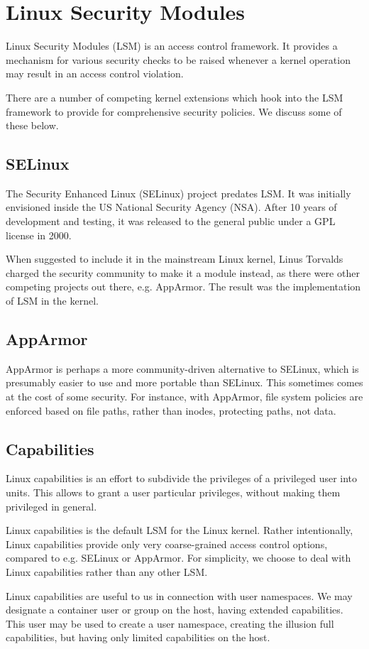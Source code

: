 
\section{Linux Security Modules}

Linux Security Modules (LSM) is an access control framework. It provides a
mechanism for various security checks to be raised whenever a kernel operation
may result in an access control violation\cite{wright-et-al-2002,lsm.txt}.

There are a number of competing kernel extensions which hook into the LSM
framework to provide for comprehensive security policies. We discuss some of
these below.

\subsection{SELinux}

The Security Enhanced Linux\textsuperscript{\textregistered} (SELinux) project
predates LSM. It was initially envisioned inside the US National Security
Agency (NSA). After 10 years of development and testing, it was released to the
general public under a GPL license in 2000\cite{ivashko-2012}.

When suggested to include it in the mainstream Linux kernel, Linus Torvalds
charged the security community to make it a module instead, as there were other
competing projects out there, e.g. AppArmor. The result was the implementation
of LSM in the kernel\cite{wright-et-al-2002}.

\subsection{AppArmor}

AppArmor is perhaps a more community-driven alternative to SELinux, which is
presumably easier to use and more portable than SELinux\cite{spenneberg-2006}.
This sometimes comes at the cost of some security. For instance, with AppArmor,
file system policies are enforced based on file paths, rather than inodes,
protecting paths, not data.

\subsection{Capabilities}

Linux capabilities is an effort to subdivide the privileges of a privileged
user into units. This allows to grant a user particular privileges, without
making them privileged in general.

Linux capabilities is the default LSM for the Linux kernel\cite{lsm.txt}.
Rather intentionally, Linux capabilities provide only very coarse-grained
access control options, compared to e.g. SELinux or AppArmor. For simplicity,
we choose to deal with Linux capabilities rather than any other LSM.

Linux capabilities are useful to us in connection with user namespaces. We may
designate a container user or group on the host, having extended capabilities.
This user may be used to create a user namespace, creating the illusion full
capabilities, but having only limited capabilities on the host.
